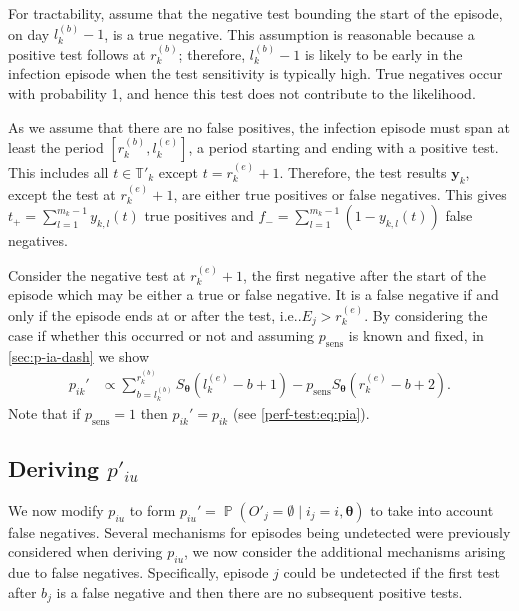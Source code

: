 \documentclass[12pt]{article}
\makeatletter
\DeclareMathOperator{\prob}{\mathbb{P}}
\renewcommand{\vec}[1]{\bm{#1}}
\newcommand{\psens}{p_\text{sens}}
\newcommand{\sched}{\mathbb{T}}
\DeclareRobustCommand\onedot{\futurelet\@let@token\@onedot}
\def\@onedot{\ifx\@let@token.\else.\null\fi\xspace}
\def\ie{i.e\onedot} \def\Ie{{I.e}\onedot}
\makeatother
\begin{document}

For tractability, assume that the negative test bounding the start of the episode, on day $l_k^{(b)}-1$, is a true negative.
This assumption is reasonable because a positive test follows at $r_k^{(b)}$; therefore, $l_k^{(b)}-1$ is likely to be early in the infection episode when the test sensitivity is typically high.
True negatives occur with probability 1, and hence this test does not contribute to the likelihood.

As we assume that there are no false positives, the infection episode must span at least the period $[r^{(b)}_k, l^{(e)}_k]$, a period starting and ending with a positive test.
This includes all $t \in \sched'_k$ except $t = r_k^{(e)}+1$.
Therefore, the test results $\vec{y}_k$, except the test at $r_k^{(e)}+1$, are either true positives or false negatives.
This gives $t_+ = \sum_{l=1}^{m_k-1} y_{k,l}(t)$ true positives and $f_- = \sum_{l=1}^{m_k-1} (1 - y_{k,l}(t))$ false negatives.

Consider the negative test at $r_k^{(e)}+1$, the first negative after the start of the episode which may be either a true or false negative.
It is a false negative if and only if the episode ends at or after the test, \ie $E_j > r_k^{(e)}$.
By considering the case if whether this occurred or not and assuming $\psens$ is known and fixed, in \cref{sec:p-ia-dash} we show
\begin{align}
p_{ik}'
&\propto \sum_{b = l_k^{(b)}}^{r_k^{(b)}} S_{\vec{\theta}}(l_k^{(e)} - b + 1) - p_\text{sens} S_{\vec{\theta}}(r_k^{(e)} - b + 2).
\label{imperf-test:eq:pia-prime-constant}
\end{align}
Note that if $p_\text{sens} = 1$ then $p_{ik}' = p_{ik}$ (see \cref{perf-test:eq:pia}).

\subsection{Deriving $p'_{iu}$} \label{imperf-test:sec:modifying-p_iu}

We now modify $p_{iu}$ to form $p_{iu}' = \prob(O'_j = \emptyset \mid i_j = i, \vec{\theta})$ to take into account false negatives.
Several mechanisms for episodes being undetected were previously considered when deriving $p_{iu}$, we now consider the additional mechanisms arising due to false negatives.
Specifically, episode $j$ could be undetected if the first test after $b_j$ is a false negative and then there are no subsequent positive tests.
\end{document}
